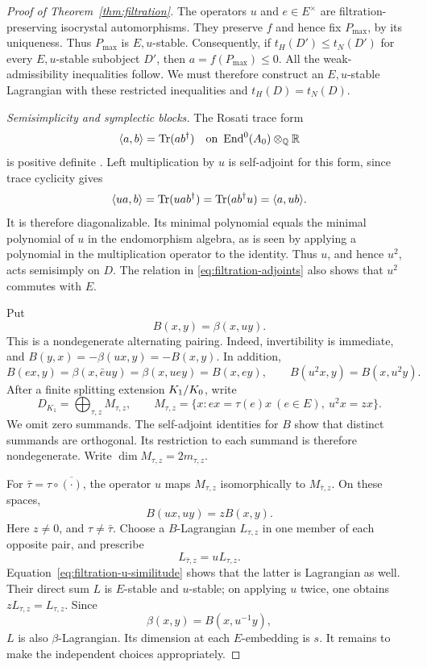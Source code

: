 \begin{proof}[Proof of Theorem~\ref{thm:filtration}]
The operators $u$ and $e\in E^\times$ are filtration-preserving
isocrystal automorphisms.  They preserve $f$ and hence fix
$P_{\max}$, by its uniqueness.  Thus $P_{\max}$ is $E,u$-stable.
Consequently, if $t_H(D')\leq t_N(D')$ for every $E,u$-stable
subobject $D'$, then $a=f(P_{\max})\leq0$. All the
weak-admissibility inequalities follow. We must therefore construct
an $E,u$-stable Lagrangian with these restricted inequalities and
$t_H(D)=t_N(D)$.

\medskip\noindent
\emph{Semisimplicity and symplectic blocks.}
The Rosati trace form
\[
 \langle a,b\rangle=\operatorname{Tr}(ab^\dagger)
 \quad\text{on }\operatorname{End}^0(A_0)\otimes_\mathbb Q\mathbb R
\]
is positive definite \cite[Theorem~17.3]{MilneAV}.  Left multiplication
by $u$ is self-adjoint for this form, since trace cyclicity gives
\[
 \langle ua,b\rangle=\operatorname{Tr}(uab^\dagger)
 =\operatorname{Tr}(ab^\dagger u)=\langle a,ub\rangle.
\]
It is therefore diagonalizable.  Its minimal polynomial equals the
minimal polynomial of $u$ in the endomorphism algebra, as is seen by
applying a polynomial in the multiplication operator to the identity.
Thus $u$, and hence $u^2$, acts semisimply on $D$.  The relation in
\eqref{eq:filtration-adjoints} also shows that $u^2$ commutes with $E$.

Put
\[
 B(x,y)=\beta(x,uy).
\]
This is a nondegenerate alternating pairing.  Indeed, invertibility is
immediate, and
$B(y,x)=-\beta(ux,y)=-B(x,y)$.  In addition,
\[
 B(ex,y)=\beta(x,\bar euy)=\beta(x,uey)=B(x,ey),
 \qquad B(u^2x,y)=B(x,u^2y).
\]
After a finite splitting extension $K_1/K_0$, write
\[
 D_{K_1}=\bigoplus_{\tau,z}M_{\tau,z},
 \qquad
 M_{\tau,z}=\{x:ex=\tau(e)x\ (e\in E),\ u^2x=zx\}.
\]
We omit zero summands.  The self-adjoint identities for $B$ show that
distinct summands are orthogonal.  Its restriction to each summand is
therefore nondegenerate.  Write $\dim M_{\tau,z}=2m_{\tau,z}$.

For $\bar\tau=\tau\circ\overline{(\cdot)}$, the operator $u$ maps
$M_{\tau,z}$ isomorphically to $M_{\bar\tau,z}$.  On these spaces,
\begin{equation}
\label{eq:filtration-u-similitude}
 B(ux,uy)=zB(x,y).
\end{equation}
Here $z\neq 0$, and $\tau\neq\bar\tau$.  Choose a $B$-Lagrangian
$L_{\tau,z}$ in one member of each opposite pair, and prescribe
\begin{equation}
\label{eq:filtration-opposite-choice}
 L_{\bar\tau,z}=uL_{\tau,z}.
\end{equation}
Equation~\eqref{eq:filtration-u-similitude} shows that the latter is
Lagrangian as well.  Their direct sum $L$ is $E$-stable and $u$-stable;
on applying $u$ twice, one obtains $zL_{\tau,z}=L_{\tau,z}$.  Since
\[
 \beta(x,y)=B(x,u^{-1}y),
\]
$L$ is also $\beta$-Lagrangian.  Its dimension at each $E$-embedding
is $s$.  It remains to make the independent choices appropriately.


\end{proof}
